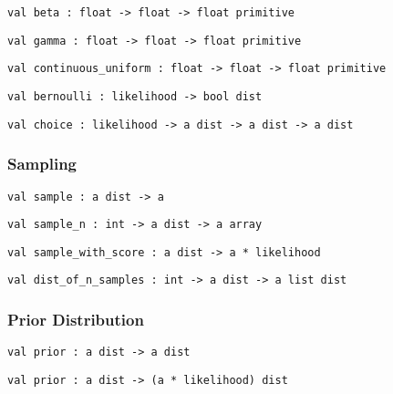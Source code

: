 \protect\hyperlink{val-beta}{}\texttt{val\ beta\ :\ float\ -\textgreater{}\ float\ -\textgreater{}\ float\ primitive}

\protect\hyperlink{val-gamma}{}\texttt{val\ gamma\ :\ float\ -\textgreater{}\ float\ -\textgreater{}\ float\ primitive}

\protect\hyperlink{val-continuousux5funiform}{}\texttt{val\ continuous\_uniform\ :\ float\ -\textgreater{}\ float\ -\textgreater{}\ float\ primitive}

\protect\hyperlink{val-bernoulli}{}\texttt{val\ bernoulli\ :\ likelihood\ -\textgreater{}\ bool\ dist}

\protect\hyperlink{val-choice}{}\texttt{val\ choice\ :\ likelihood\ -\textgreater{}\ \textquotesingle{}a\ dist\ -\textgreater{}\ \textquotesingle{}a\ dist\ -\textgreater{}\ \textquotesingle{}a\ dist}

\hypertarget{distux5fsample}{\subsubsection{\texorpdfstring{\protect\hyperlink{distux5fsample}{}Sampling}{Sampling}}\label{distux5fsample}}

\protect\hyperlink{val-sample}{}\texttt{val\ sample\ :\ \textquotesingle{}a\ dist\ -\textgreater{}\ \textquotesingle{}a}

\protect\hyperlink{val-sampleux5fn}{}\texttt{val\ sample\_n\ :\ int\ -\textgreater{}\ \textquotesingle{}a\ dist\ -\textgreater{}\ \textquotesingle{}a\ array}

\protect\hyperlink{val-sampleux5fwithux5fscore}{}\texttt{val\ sample\_with\_score\ :\ \textquotesingle{}a\ dist\ -\textgreater{}\ \textquotesingle{}a\ *\ likelihood}

\protect\hyperlink{val-distux5fofux5fnux5fsamples}{}\texttt{val\ dist\_of\_n\_samples\ :\ int\ -\textgreater{}\ \textquotesingle{}a\ dist\ -\textgreater{}\ \textquotesingle{}a\ list\ dist}

\hypertarget{prior}{\subsubsection{\texorpdfstring{\protect\hyperlink{prior}{}Prior
Distribution}{Prior Distribution}}\label{prior}}

\protect\hyperlink{val-priorux27}{}\texttt{val\ prior\textquotesingle{}\ :\ \textquotesingle{}a\ dist\ -\textgreater{}\ \textquotesingle{}a\ dist}

\protect\hyperlink{val-prior}{}\texttt{val\ prior\ :\ \textquotesingle{}a\ dist\ -\textgreater{}\ (\textquotesingle{}a\ *\ likelihood)\ dist}

